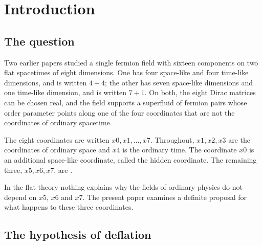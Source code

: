\section{Introduction}
\label{sec:intro}

\subsection{The question}

Two earlier papers \cite{Flat1644,Flat1671} studied a single fermion field with sixteen components on
two flat spacetimes of eight dimensions. One has four space-like and four time-like dimensions, and is
written $4+4$; the other has seven space-like dimensions and one time-like dimension, and is written
$7+1$. On both, the eight Dirac matrices can be chosen real, and the field supports a superfluid of
fermion pairs whose order parameter points along one of the four coordinates that are not the
coordinates of ordinary spacetime. 

The eight coordinates are written $x0,x1,\dots,x7$. Throughout, $x1,x2,x3$ are the coordinates of
ordinary space and $x4$ is the ordinary time. The coordinate $x0$ is an additional space-like
coordinate, called the hidden coordinate. The remaining three, $x5,x6,x7$, are
.

In the flat theory nothing explains why the fields of ordinary physics do not depend on $x5$, $x6$
and $x7$.  The present paper examines a definite proposal for what
happens to these three coordinates.

\subsection{The hypothesis of deflation}

